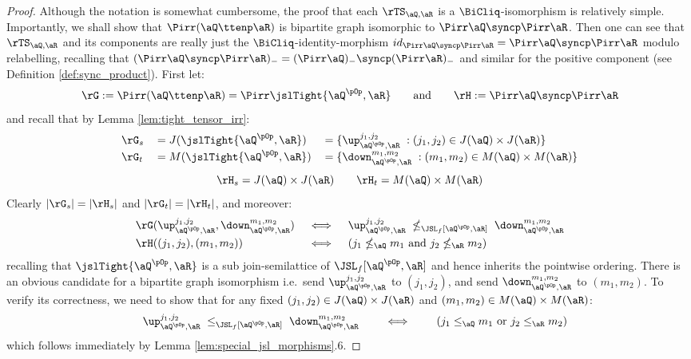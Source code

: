 \documentclass{article}
\begin{document}
\begin{proof}
Although the notation is somewhat cumbersome, the proof that each $\rTS_{\aQ,\aR}$ is a $\BiCliq$-isomorphism is relatively simple. Importantly, we shall show that $\Pirr(\aQ \ttenp \aR)$ is bipartite graph isomorphic to $\Pirr \aQ \syncp \Pirr \aR$. Then one can see that $\rTS_{\aQ,\aR}$ and its components are really just the $\BiCliq$-identity-morphism $id_{\Pirr \aQ \syncp \Pirr \aR} = \Pirr \aQ \syncp \Pirr \aR$ modulo relabelling, recalling that $(\Pirr \aQ \syncp \Pirr \aR)_- = (\Pirr \aQ)_- \syncp (\Pirr \aR)_-$ and similar for the positive component (see Definition \ref{def:sync_product}). First let:
\[
\rG := \Pirr(\aQ \ttenp \aR) = \Pirr\jslTight{\aQ^{\pOp},\aR}
\qquad\text{and}\qquad
\rH := \Pirr\aQ \syncp \Pirr\aR
\]
and recall that by Lemma \ref{lem:tight_tensor_irr}:
\[
\begin{tabular}{lll}
$\rG_s$ & $= J(\jslTight{\aQ^{\pOp},\aR})$ & $= \{ \up_{\aQ^{\pOp},\aR}^{j_1,j_2} \; : (j_1,j_2) \in J(\aQ) \times J(\aR) \}$
\\[0.5ex]
$\rG_t$ & $= M(\jslTight{\aQ^{\pOp},\aR})$ & $= \{ \down_{\aQ^{\pOp},\aR}^{m_1,m_2} \; : (m_1,m_2) \in M(\aQ) \times M(\aR) \}$
\end{tabular}
\]
\[
\rH_s = J(\aQ) \times J(\aR)
\qquad
\rH_t = M(\aQ) \times M(\aR)
\]
Clearly $|\rG_s| = |\rH_s|$ and $|\rG_t| = |\rH_t|$, and moreover:
\[
\begin{tabular}{lll}
$\rG(\up_{\aQ^{\pOp},\aR}^{j_1,j_2},\down_{\aQ^{\pOp},\aR}^{m_1,m_2})$
& $\iff$ &
$\up_{\aQ^{\pOp},\aR}^{j_1,j_2} \; \nleq_{\JSL_f[\aQ^{\pOp},\aR]} \; \down_{\aQ^{\pOp},\aR}^{m_1,m_2}$
\\[1ex]
$\rH((j_1,j_2),(m_1,m_2))$ & $\iff$ & ($j_1 \nleq_\aQ m_1$ and $j_2 \nleq_\aR m_2$)
\end{tabular}
\]
recalling that $\jslTight{\aQ^{\pOp},\aR}$ is a sub join-semilattice of $\JSL_f[\aQ^{\pOp},\aR]$ and hence inherits the pointwise ordering. There is an obvious candidate for a bipartite graph isomorphism i.e.\ send $\up_{\aQ^{\pOp},\aR}^{j_1,j_2}$ to $(j_1,j_2)$, and send $\down_{\aQ^{\pOp},\aR}^{m_1,m_2}$ to $(m_1,m_2)$. To verify its correctness, we need to show that for any fixed $(j_1,j_2) \in J(\aQ) \times J(\aR)$ and $(m_1,m_2) \in M(\aQ) \times M(\aR)$:
\[
\quad \up_{\aQ^{\pOp},\aR}^{j_1,j_2} \; \leq_{\JSL_f[\aQ^{\pOp},\aR]} \; \down_{\aQ^{\pOp},\aR}^{m_1,m_2}
\qquad\iff\qquad
(j_1 \leq_\aQ m_1 \text{ or } j_2 \leq_\aR m_2)
\]
which follows immediately by Lemma \ref{lem:special_jsl_morphisms}.6.


\end{proof}
\end{document}
